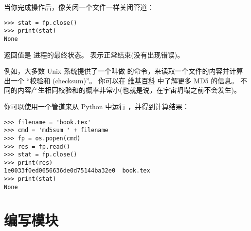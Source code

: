 {{{{{{{当你完成操作后，像关闭一个文件一样关闭管道：

  

\begin{lstlisting}
>>> stat = fp.close()
>>> print(stat)
None
\end{lstlisting}

%

返回值是  进程的最终状态。  表示正常结束(没有出现错误)。


例如，大多数 Unix 系统提供了一个叫做  的命令，来读取一个文件的内容并计算出一个 ``校验和 (checksum)''。
你可以在 \href{http://en.wikipedia.org/wiki/Md5}{维基百科} 中了解更多 MD5 的信息。
不同的内容产生相同校验和的概率非常小(也就是说，在宇宙坍塌之前不会发生)。
  




你可以使用一个管道来从 Python 中运行  ，并得到计算结果：

\begin{lstlisting}
>>> filename = 'book.tex'
>>> cmd = 'md5sum ' + filename
>>> fp = os.popen(cmd)
>>> res = fp.read()
>>> stat = fp.close()
>>> print(res)
1e0033f0ed0656636de0d75144ba32e0  book.tex
>>> print(stat)
None
\end{lstlisting}


\section{编写模块}
\label{modules}

}}}}}}}
